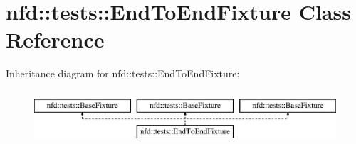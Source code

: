 \hypertarget{classnfd_1_1tests_1_1EndToEndFixture}{}\section{nfd\+:\+:tests\+:\+:End\+To\+End\+Fixture Class Reference}
\label{classnfd_1_1tests_1_1EndToEndFixture}
Inheritance diagram for nfd\+:\+:tests\+:\+:End\+To\+End\+Fixture\+:\begin{figure}[H]
\begin{center}
\leavevmode
\includegraphics[height=2.000000cm]{classnfd_1_1tests_1_1EndToEndFixture}
\end{center}
\end{figure}
